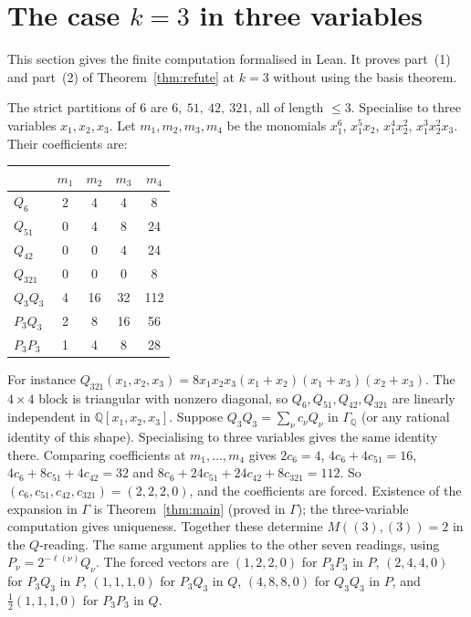 \documentclass[11pt]{article}
\theoremstyle{definition}
\theoremstyle{remark}
\begin{document}
\section{\texorpdfstring{The case $k=3$ in three variables}{The case k=3 in three variables}}

This section gives the finite computation formalised in Lean. It proves part~(1) and
part~(2) of Theorem~\ref{thm:refute} at $k=3$ without using the basis theorem.

The strict partitions of $6$ are $6,\ 51,\ 42,\ 321$, all of length $\le3$. Specialise to
three variables $x_1,x_2,x_3$. Let $m_1,m_2,m_3,m_4$ be the monomials $x_1^6$,
$x_1^5x_2$, $x_1^4x_2^2$, $x_1^3x_2^2x_3$. Their coefficients are:
\begin{center}
\begin{tabular}{lcccc}
\toprule
 & $m_1$ & $m_2$ & $m_3$ & $m_4$\\
\midrule
$Q_6$ & 2 & 4 & 4 & 8\\
$Q_{51}$ & 0 & 4 & 8 & 24\\
$Q_{42}$ & 0 & 0 & 4 & 24\\
$Q_{321}$ & 0 & 0 & 0 & 8\\
\midrule
$Q_3Q_3$ & 4 & 16 & 32 & 112\\
$P_3Q_3$ & 2 & 8 & 16 & 56\\
$P_3P_3$ & 1 & 4 & 8 & 28\\
\bottomrule
\end{tabular}
\end{center}
For instance $Q_{321}(x_1,x_2,x_3)=8x_1x_2x_3(x_1+x_2)(x_1+x_3)(x_2+x_3)$. The $4\times4$
block is triangular with nonzero diagonal, so $Q_6,Q_{51},Q_{42},Q_{321}$ are linearly
independent in $\mathbb Q[x_1,x_2,x_3]$. Suppose $Q_3Q_3=\sum_\nu c_\nu Q_\nu$ in
$\Gamma_{\mathbb Q}$ (or any rational identity of this shape). Specialising to three
variables gives the same identity there. Comparing coefficients at $m_1,\dots,m_4$ gives
$2c_6=4$, $4c_6+4c_{51}=16$, $4c_6+8c_{51}+4c_{42}=32$ and
$8c_6+24c_{51}+24c_{42}+8c_{321}=112$. So $(c_6,c_{51},c_{42},c_{321})=(2,2,2,0)$, and the
coefficients are forced. Existence of the expansion in $\Gamma$ is
Theorem~\ref{thm:main} (proved in $\Gamma$); the three-variable computation gives
uniqueness. Together these determine $M((3),(3))=2$ in the $Q$-reading. The same argument applies to the other seven readings,
using $P_\nu=2^{-\ell(\nu)}Q_\nu$. The forced vectors are $(1,2,2,0)$ for $P_3P_3$ in
$P$, $(2,4,4,0)$ for $P_3Q_3$ in $P$, $(1,1,1,0)$ for $P_3Q_3$ in $Q$, $(4,8,8,0)$ for
$Q_3Q_3$ in $P$, and $\tfrac12(1,1,1,0)$ for $P_3P_3$ in $Q$.
\end{document}
